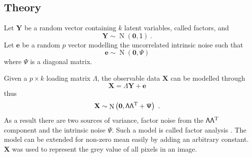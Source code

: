 \documentclass[12pt]{report}
\DeclareMathOperator{\normal}{N}
\newcommand{\T}{^\textup{T}}
\newcommand{\vect}[1]{\mathbf{#1}}
\newcommand{\matr}[1]{\mathsf{#1}}
\begin{document}
\subsection{Theory}
Let $\vect{Y}$ be a random vector containing $k$ latent variables, called factors, and
\begin{equation}
\vect{Y}\sim\normal\left(\vect{0},\matr{1}\right) \ .
\end{equation}
Let $\vect{e}$ be a random $p$ vector modelling the uncorrelated intrinsic noise such that
\begin{equation}
\vect{e}\sim\normal\left(\vect{0},\matr{\Psi}\right)
\end{equation}
where $\matr{\Psi}$ is a diagonal matrix.

Given a $p\times k$ loading matrix $\matr{\Lambda}$, the observable data $\vect{X}$ can be modelled through
\begin{equation}
\vect{X}=\matr{\Lambda}\vect{Y}+\vect{e}
\end{equation}
thus
\begin{equation}
\vect{X}\sim\normal\left(\vect{0},\matr{\Lambda}\matr{\Lambda}\T+\matr{\Psi}\right) \ .
\end{equation}
As a result there are two sources of variance, factor noise from the $\matr{\Lambda}\matr{\Lambda}\T$ component and the intrinsic noise $\matr{\Psi}$. Such a model is called factor analysis \cite[pp.~462-469]{barber2012bayesian}. The model can be extended for non-zero mean easily by adding an arbitrary constant. $\vect{X}$ was used to represent the grey value of all pixels in an image.
\end{document}
